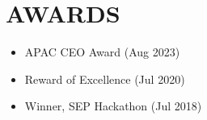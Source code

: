 \documentclass[letterpaper,11pt]{article}
\begin{document}
\section{AWARDS}
 \begin{itemize}[leftmargin=0in, label={}]
    \small
    \item APAC CEO Award (Aug 2023)
    \item Reward of Excellence (Jul 2020)
    \item Winner, SEP Hackathon (Jul 2018)
 \end{itemize}

\end{document}

